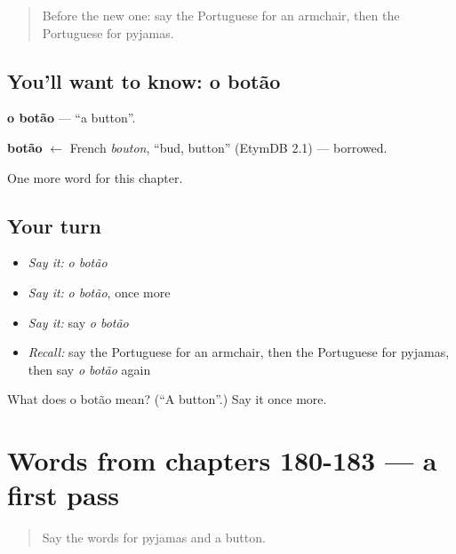 \begin{quote}
Before the new one: say the Portuguese for an armchair, then the Portuguese for pyjamas.
\end{quote}

\subsection*{You'll want to know: o botão}
\textbf{o botão} — \textquotedblleft{}a button\textquotedblright{}.

\begin{cousinweb}
\textbf{botão} $\leftarrow$ French \emph{bouton}, \textquotedblleft{}bud, button\textquotedblright{} (EtymDB 2.1) — borrowed.
\end{cousinweb}

\begin{grammarlens}[title={What you've built}]
One more word for this chapter.
\end{grammarlens}

\subsection*{Your turn}
\begin{itemize}
\raggedright
  \item \emph{Say it:} \emph{o botão}
  \item \emph{Say it:} \emph{o botão}, once more
  \item \emph{Say it:} say \emph{o botão}
  \item \emph{Recall:} say the Portuguese for an armchair, then the Portuguese for pyjamas, then say \emph{o botão} again
\end{itemize}

\begin{tcolorbox}[breakable,colback=teal!4,colframe=teal!35!black,title={Before you move on}]
What does o botão mean? (\textquotedblleft{}A button\textquotedblright{}.) Say it once more.
\end{tcolorbox}
\section[(dialogue)]{Words from chapters 180-183 — a first pass}

\label{lesson:PT-R188-first-pass-words-from-chapters-180-183}



\begin{quote}
Say the words for pyjamas and a button.
\end{quote}

